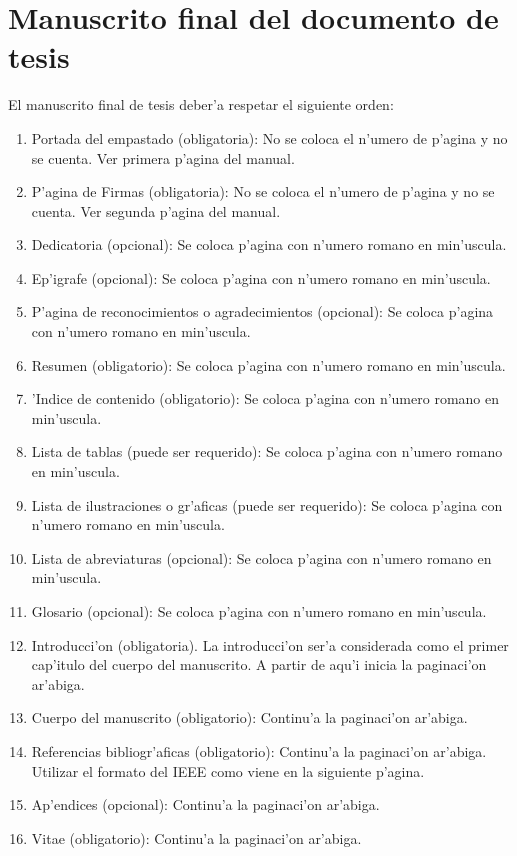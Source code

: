 \section{Manuscrito final del documento de tesis}
\noindent
El manuscrito final de tesis deber'a respetar el siguiente orden:
\begin{enumerate}
	\item Portada del empastado (obligatoria): No se coloca el n'umero de p'agina y no se cuenta. Ver primera p'agina del manual.
	\item P'agina de Firmas (obligatoria): No se coloca el n'umero de p'agina y no se cuenta. Ver segunda p'agina del manual.
	\item Dedicatoria (opcional): Se coloca p'agina con n'umero romano en min'uscula.
	\item Ep'igrafe (opcional): Se coloca p'agina con n'umero romano en min'uscula.
	\item P'agina de reconocimientos o agradecimientos (opcional): Se coloca p'agina con n'umero romano en min'uscula.
	\item Resumen (obligatorio): Se coloca p'agina con n'umero romano en min'uscula.
	\item 'Indice de contenido (obligatorio): Se coloca p'agina con n'umero romano en min'uscula.
	\item Lista de tablas (puede ser requerido): Se coloca p'agina con n'umero romano en min'uscula.
	\item Lista de ilustraciones o gr'aficas (puede ser requerido): Se coloca p'agina con n'umero romano en min'uscula.
	\item Lista de abreviaturas (opcional): Se coloca p'agina con n'umero romano en min'uscula.
	\item Glosario (opcional): Se coloca p'agina con n'umero romano en min'uscula.
	\item Introducci'on (obligatoria). La introducci'on ser'a considerada como el primer cap'itulo del cuerpo del manuscrito. A partir de aqu'i inicia la paginaci'on ar'abiga.
	\item Cuerpo del manuscrito (obligatorio): Continu'a la paginaci'on ar'abiga.
	\newpage
	\item Referencias bibliogr'aficas (obligatorio): Continu'a la paginaci'on ar'abiga. Utilizar el formato del IEEE como viene en la siguiente p'agina.
	\item Ap'endices (opcional): Continu'a la paginaci'on ar'abiga.
	\item Vitae (obligatorio): Continu'a la paginaci'on ar'abiga.
\end{enumerate}

\clearpage